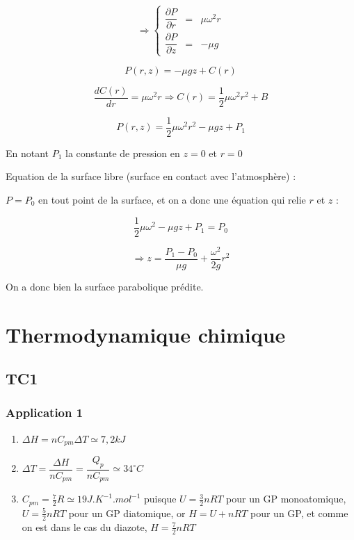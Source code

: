 \documentclass[a4paper,12pt]{book}
\begin{document}
\par $$\Rightarrow \left\{\begin{array}{rcl} \dfrac{\partial P}{\partial r} & = & \mu\omega^2 r \\ \dfrac{\partial P}{\partial z} &=& -\mu g\end{array}\right.$$
\par $$ P(r,z) = -\mu gz + C(r)$$
\par $$\frac{d C(r)}{dr}=\mu\omega^2r \Rightarrow C(r) = \frac{1}{2}\mu\omega^2r^2 + B$$
\par $$P(r,z) = \frac{1}{2}\mu \omega^2r^2 - \mu g z + P_1$$
\par En notant $P_1$ la constante de pression en $z=0$ et $r=0$
\par Equation de la surface libre (surface en contact avec l'atmosphère) :
\par $P = P_0$ en tout point de la surface, et on a donc une équation qui relie $r$ et $z$ :
\par $$\frac{1}{2}\mu\omega^2 - \mu g z + P_1 = P_0$$
\par $$\Rightarrow z = \frac{P_1-P_0}{\mu g}+\frac{\omega^2}{2g}r^2$$
\par On a donc bien la surface parabolique prédite.









\chapter{Thermodynamique chimique}
\section{TC1}
\subsection{Application 1}
\begin{enumerate}
\item $\Delta H = nC_{pm}\Delta T \simeq 7,2kJ$
\item $\Delta T = \dfrac{\Delta H}{nC_{pm}}=\dfrac{Q_p}{nC_{pm}}\simeq 34^\circ C$
\item $C_{pm}=\frac{7}{2}R\simeq 19J.K^{-1}.mol^{-1}$ puisque $U=\frac{3}{2}nRT$ pour un GP monoatomique, $U=\frac{5}{2}nRT$ pour un GP diatomique, or $H=U+nRT$ pour un GP, et comme on est dans le cas du diazote, $H=\frac{7}{2}nRT$
\end{enumerate}
\end{document}
